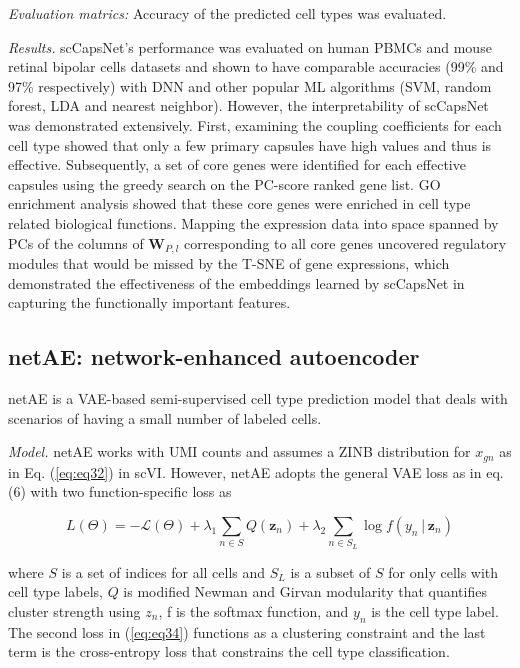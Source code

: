 \documentclass[
]{book}
\begin{document}
\emph{Evaluation matrics:} Accuracy of the predicted cell types was evaluated.

\emph{Results.} scCapsNet's performance was evaluated on human PBMCs \citep{RN161} and mouse retinal bipolar cells \citep{RN163} datasets and shown to have comparable accuracies (99\% and 97\% respectively) with DNN and other popular ML algorithms (SVM, random forest, LDA and nearest neighbor). However, the interpretability of scCapsNet was demonstrated extensively. First, examining the coupling coefficients for each cell type showed that only a few primary capsules have high values and thus is effective. Subsequently, a set of core genes were identified for each effective capsules using the greedy search on the PC-score ranked gene list. GO enrichment analysis showed that these core genes were enriched in cell type related biological functions. Mapping the expression data into space spanned by PCs of the columns of \(\boldsymbol{W}_{P,l}\) corresponding to all core genes uncovered regulatory modules that would be missed by the T-SNE of gene expressions, which demonstrated the effectiveness of the embeddings learned by scCapsNet in capturing the functionally important features.

\hypertarget{ch-5-6-3}{%
\subsection{netAE: network-enhanced autoencoder}\label{ch-5-6-3}}

netAE \citep{RN165} is a VAE-based semi-supervised cell type prediction model that deals with scenarios of having a small number of labeled cells.

\emph{Model.} netAE works with UMI counts and assumes a ZINB distribution for \(x_{gn}\) as in Eq. (\eqref{eq:eq32}) in scVI. However, netAE adopts the general VAE loss as in eq. (6) with two function-specific loss as

\begin{equation}
L(\Theta)=-\mathcal{L}(\Theta)+\lambda_{1} \sum_{n\in S}Q(\mathbf{z}_{n}) +\lambda_{2}\sum_{n \in S_{L}} \log{ f(y_{n}│\mathbf{z}_{n})} \label{eq:eq45}
\end{equation}

where \(S\) is a set of indices for all cells and \(S_{L}\) is a subset of \(S\) for only cells with cell type labels, \(Q\) is modified Newman and Girvan modularity \citep{RN166} that quantifies cluster strength using \(z_{n}\), f is the softmax function, and \(y_{n}\) is the cell type label. The second loss in (\eqref{eq:eq34}) functions as a clustering constraint and the last term is the cross-entropy loss that constrains the cell type classification.
\end{document}
